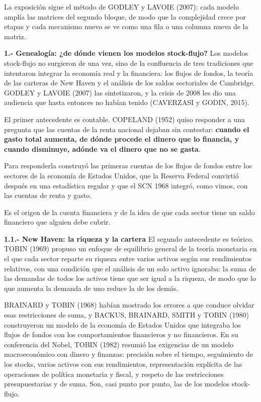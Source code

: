 \documentclass[10pt,a4paper]{article}
\begin{document}
La exposición sigue el método de GODLEY y LAVOIE (2007): cada modelo amplía las matrices del segundo bloque, de modo que la complejidad crece por etapas y cada mecanismo nuevo se ve como una fila o una columna nueva de la matriz.

\textbf{1.- Genealogía: ¿de dónde vienen los modelos stock-flujo?}
Los modelos stock-flujo no surgieron de una vez, sino de la confluencia de tres tradiciones que intentaron integrar la economía real y la financiera: los flujos de fondos, la teoría de las carteras de New Haven y el análisis de los saldos sectoriales de Cambridge. GODLEY y LAVOIE (2007) las sintetizaron, y la crisis de 2008 les dio una audiencia que hasta entonces no habían tenido (CAVERZASI y GODIN, 2015).

El primer antecedente es contable. COPELAND (1952) quiso responder a una pregunta que las cuentas de la renta nacional dejaban sin contestar: \textbf{cuando el gasto total aumenta, de dónde procede el dinero que lo financia, y cuando disminuye, adónde va el dinero que no se gasta}. 

Para responderla construyó las primeras cuentas de los flujos de fondos entre los sectores de la economía de Estados Unidos, que la Reserva Federal convirtió después en una estadística regular y que el SCN 1968 integró, como vimos, con las cuentas de renta y gasto. 

Es el origen de la cuenta financiera y de la idea de que cada sector tiene un saldo financiero que alguien debe cubrir.

\textbf{1.1.- New Haven: la riqueza y la cartera}
El segundo antecedente es teórico. TOBIN (1969) propuso un enfoque de equilibrio general de la teoría monetaria en el que cada sector reparte su riqueza entre varios activos según sus rendimientos relativos, con una condición que el análisis de un solo activo ignoraba: la suma de las demandas de todos los activos tiene que ser igual a la riqueza, de modo que lo que aumenta la demanda de uno reduce la de los demás. 

BRAINARD y TOBIN (1968) habían mostrado los errores a que conduce olvidar esas restricciones de suma, y BACKUS, BRAINARD, SMITH y TOBIN (1980) construyeron un modelo de la economía de Estados Unidos que integraba los flujos de fondos con los comportamientos financieros y no financieros. En su conferencia del Nobel, TOBIN (1982) resumió las exigencias de un modelo macroeconómico con dinero y finanzas: precisión sobre el tiempo, seguimiento de los stocks, varios activos con sus rendimientos, representación explícita de las operaciones de política monetaria y fiscal, y respeto de las restricciones presupuestarias y de suma. Son, casi punto por punto, las de los modelos stock-flujo.
\end{document}
